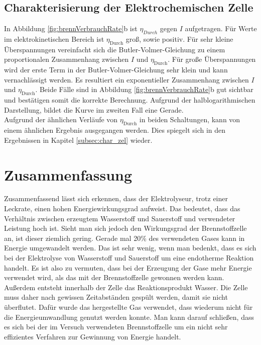 \documentclass[a4paper,usenatbib]{aspdoc}
\begin{document}
       \subsection{Charakterisierung der Elektrochemischen Zelle}\label{subsec:discuss_char}
            In Abbildung \ref{fig:brennVerbrauchRate}b ist $\eta_{Durch}$ gegen $I$ aufgetragen. Für Werte im elektrokinetischen Bereich ist $\eta_{\mathrm{Durch}}$ groß, sowie positiv. Für sehr kleine Überspannungen vereinfacht sich die Butler-Volmer-Gleichung \citep{anleitung} zu einem proportionalen Zusammenhang zwischen $I$ und $\eta_{\mathrm{Durch}}$. Für große Überspannungen wird der erste Term in der Butler-Volmer-Gleichung sehr klein und kann vernachlässigt werden. Es resultiert ein exponentieller Zusammenhang zwischen $I$ und $\eta_{\mathrm{Durch}}$. Beide Fälle sind in Abbildung \ref{fig:brennVerbrauchRate}b gut sichtbar und bestätigen somit die korrekte Berechnung. Aufgrund der halblogarithmischen Darstellung, bildet die Kurve im zweiten Fall eine Gerade.
            \\
            Aufgrund der ähnlichen Verläufe von $\eta_{\mathrm{Durch}}$ in beiden Schaltungen, kann von einem ähnlichen Ergebnis ausgegangen werden. Dies spiegelt sich in den Ergebnissen in Kapitel \ref{subsec:char_zel} wieder. 
       
       
    \section{Zusammenfassung}\label{sec:conclusion}
            Zusammenfassend lässt sich erkennen, dass der Elektrolyseur, trotz einer Leckrate, einen hohen Energiewirkungsgrad aufweist. Das bedeutet, dass das Verhältnis zwischen erzeugtem Wasserstoff und Sauerstoff und verwendeter Leistung hoch ist. Sieht man sich jedoch den Wirkungsgrad der Brennstoffzelle an, ist dieser ziemlich gering. Gerade mal 20\% des verwendeten Gases kann in Energie umgewandelt werden. Das ist sehr wenig, wenn man bedenkt, dass es sich bei der Elektrolyse von Wasserstoff und Sauerstoff um eine endotherme Reaktion handelt. Es ist also zu vermuten, dass bei der Erzeugung der Gase mehr Energie verwendet wird, als das mit der Brennstoffzelle gewonnen werden kann. \\
            Außerdem entsteht innerhalb der Zelle das Reaktionsprodukt Wasser. Die Zelle muss daher nach gewissen Zeitabständen gespült werden, damit sie nicht überflutet. Dafür wurde das hergestellte Gas verwendet, dass wiederum nicht für die Energieumwandlung genutzt werden konnte.
            Man kann darauf schließen, dass es sich bei der im Versuch verwendeten Brennstoffzelle um ein nicht sehr effizientes Verfahren zur Gewinnung von Energie handelt.
\end{document}
